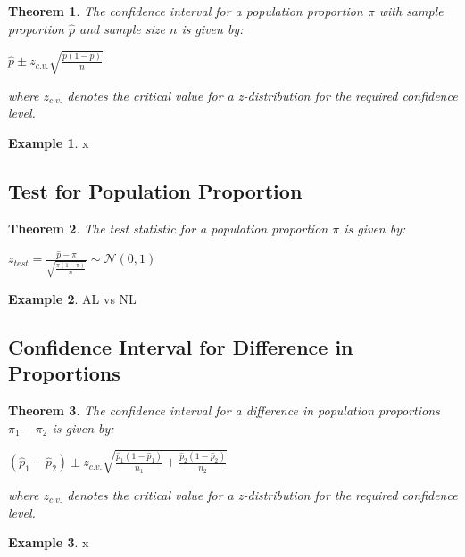 \documentclass[
  11pt,
]{book}
\newtheorem{theorem}{Theorem}[chapter]
\theoremstyle{definition}
\theoremstyle{definition}
\newtheorem{example}{Example}[chapter]
\theoremstyle{definition}
\theoremstyle{definition}
\theoremstyle{remark}
\begin{document}
\begin{theorem}
The confidence interval for a population proportion \(\pi\) with sample proportion \(\hat{p}\) and sample size \(n\) is given by:

\(\hat{p} \pm z_{c.v.}\sqrt{\frac{p(1-p)}{n}}\)

where \(z_{c.v.}\) denotes the critical value for a z-distribution for the required confidence level.
\end{theorem}

\begin{example}
x
\end{example}

\newpage

\hypertarget{test-for-population-proportion}{%
\subsection{Test for Population Proportion}\label{test-for-population-proportion}}

\begin{theorem}
The test statistic for a population proportion \(\pi\) is given by:

\(z_{test} = \frac{\hat{p}-\pi}{\sqrt{\frac{\pi(1-\pi)}{n}}} \sim \mathcal{N}(0,1)\)
\end{theorem}

\begin{example}
AL vs NL
\end{example}

\newpage

\hypertarget{confidence-interval-for-difference-in-proportions}{%
\subsection{Confidence Interval for Difference in Proportions}\label{confidence-interval-for-difference-in-proportions}}

\begin{theorem}
The confidence interval for a difference in population proportions \(\pi_1 - \pi_2\) is given by:

\((\hat{p}_1 - \hat{p}_2) \pm z_{c.v.}\sqrt{\frac{\hat{p}_1(1-\hat{p}_1)}{n_1}+\frac{\hat{p}_2(1-\hat{p}_2)}{n_2}}\)

where \(z_{c.v.}\) denotes the critical value for a z-distribution for the required confidence level.
\end{theorem}

\begin{example}
x
\end{example}
\end{document}

